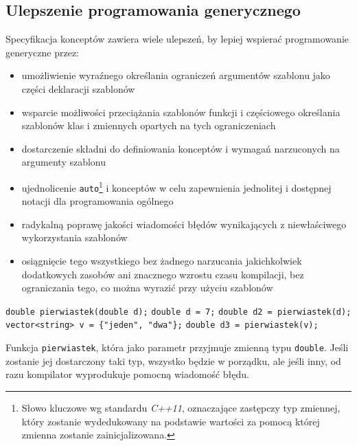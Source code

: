 \documentclass[11pt, a4paper]{article}
\begin{document}
\lstset{language=C++}

\subsection{Ulepszenie programowania generycznego}

Specyfikacja konceptów zawiera wiele ulepszeń, by lepiej wspierać programowanie generyczne przez:
\begin{itemize}

\item umożliwienie wyraźnego określania ograniczeń argumentów szablonu jako części deklaracji szablonów
\item wsparcie możliwości przeciążania szablonów funkcji i częściowego określania szablonów klas i zmiennych opartych na tych ograniczeniach
\item dostarczenie składni do definiowania konceptów i wymagań narzuconych na argumenty szablonu
\item ujednolicenie \verb#auto#\footnote{Słowo kluczowe wg standardu \emph{C++11}, oznaczające zastępczy typ zmiennej, który zostanie wydedukowany na podstawie wartości za pomocą której zmienna zostanie zainicjalizowana.} i konceptów w celu zapewnienia jednolitej i dostępnej notacji dla programowania ogólnego
\item radykalną poprawę jakości wiadomości błędów wynikających z niewłaściwego wykorzystania szablonów
\item osiągnięcie tego wszystkiego bez żadnego narzucania jakichkolwiek dodatkowych zasobów ani znacznego wzrostu czasu kompilacji, bez ograniczania tego, co można wyrazić przy użyciu szablonów

\end{itemize}

\noindent\verb#double pierwiastek(double d);# \newline
\verb#double d = 7;# \newline
\verb#double d2 = pierwiastek(d);# \newline
\verb#vector<string> v = {"jeden", "dwa"};# \newline
\verb#double d3 = pierwiastek(v);# \newline

Funkcja \verb#pierwiastek#, która jako parametr przyjmuje zmienną typu \verb#double#. Jeśli zostanie jej dostarczony taki typ, wszystko będzie w porządku, ale jeśli inny, od razu kompilator wyprodukuje pomocną wiadomość błędu.\newline
\end{document}
